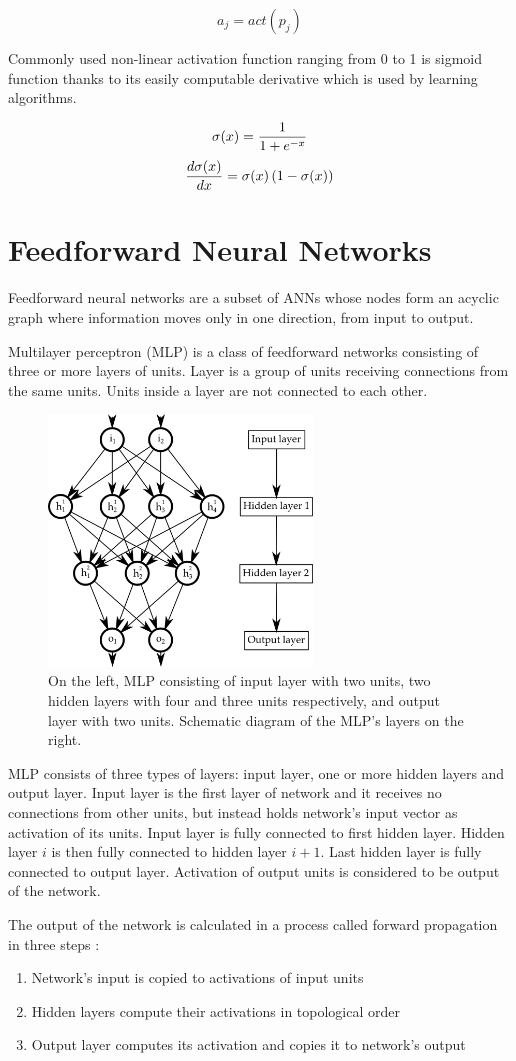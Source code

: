 \documentclass[12pt,oneside]{fithesis2}
\begin{document}
$$a_{j} = act\left(p_j\right)$$
\par
Commonly used non-linear activation function ranging from 0 to 1 is sigmoid function thanks to its easily computable derivative which is used by learning algorithms.

$$\sigma(x) = {1 \over {1 + e^{-x}}}$$
$${{d\sigma(x)} \over dx} = \sigma(x)  \left(1 - \sigma(x)\right)$$

\section{Feedforward Neural Networks}
Feedforward neural networks are a subset of ANNs whose nodes form an acyclic graph where information moves only in one direction, from input to output. \par
Multilayer perceptron (MLP) is a class of feedforward networks consisting of three or more layers of units. Layer is a group of units receiving connections from the same units. Units inside a layer are not connected to each other. \par
	\begin{figure}[ht]
		\centering
		\includegraphics[width=265px]{mlp.png}
		\caption{On the left, MLP consisting of input layer with two units, two hidden layers with four and three units respectively, and output layer with two units. Schematic diagram of the MLP's layers on the right.}
	\end{figure}
MLP consists of three types of layers: input layer, one or more hidden layers and output layer. Input layer is the first layer of network and it receives no connections from other units, but instead holds network's input vector as activation of its units. Input layer is fully connected to first hidden layer. Hidden layer $i$ is then fully connected to hidden layer $i + 1$. Last hidden layer is fully connected to output layer. Activation of output units is considered to be output of the network. \par
The output of the network is calculated in a process called forward propagation in three steps :
\begin{enumerate}
	\item Network's input is copied to activations of input units
	\item Hidden layers compute their activations in topological order
	\item Output layer computes its activation and copies it to network's output
\end{enumerate}
\end{document}
